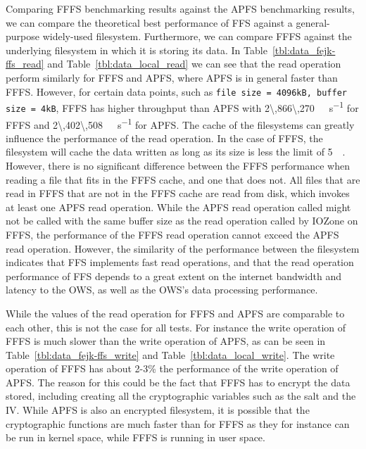 Comparing \gls{FFFS} benchmarking results against the \gls{APFS} benchmarking results, we can compare the theoretical best performance of \gls{FFS} against a \mbox{general-purpose} \mbox{widely-used} filesystem. Furthermore, we can compare \gls{FFFS} against the underlying filesystem in which it is storing its data. In Table~\ref{tbl:data_fejk-ffs_read} and Table~\ref{tbl:data_local_read} we can see that the read operation perform similarly for \gls{FFFS} and \gls{APFS}, where \gls{APFS} is in general faster than \gls{FFFS}. However, for certain data points, such as \texttt{file size = 4096kB, buffer size = 4kB}, \gls{FFFS} has higher throughput than \gls{APFS} with \SI[per-mode = symbol]{2\,866\,270}{\kilo\byte\per\second} for \gls{FFFS} and \SI[per-mode = symbol]{2\,402\,508}{\kilo\byte\per\second} for \gls{APFS}. The cache of the filesystems can greatly influence the performance of the read operation. In the case of \gls{FFFS}, the filesystem will cache the data written as long as its size is less the limit of \SI{5}{\mega\byte}. However, there is no significant difference between the \gls{FFFS} performance when reading a file that fits in the \gls{FFFS} cache, and one that does not. All files that are read in \gls{FFFS} that are not in the \gls{FFFS} cache are read from disk, which invokes at least one \gls{APFS} read operation. While the \gls{APFS} read operation called might not be called with the same buffer size as the read operation called by IOZone on \gls{FFFS}, the performance of the \gls{FFFS} read operation cannot exceed the \gls{APFS} read operation. However, the similarity of the performance between the filesystem indicates that \gls{FFS} implements fast read operations, and that the read operation performance of \gls{FFS} depends to a great extent on the internet bandwidth and latency to the \gls{OWS}, as well as the \gls{OWS}'s data processing performance.

While the values of the read operation for \gls{FFFS} and \gls{APFS} are comparable to each other, this is not the case for all tests. For instance the write operation of \gls{FFFS} is much slower than the write operation of \gls{APFS}, as can be seen in Table~\ref{tbl:data_fejk-ffs_write} and Table~\ref{tbl:data_local_write}. The write operation of \gls{FFFS} has about \mbox{2-3}\% the performance of the write operation of \gls{APFS}. The reason for this could be the fact that \gls{FFFS} has to encrypt the data stored, including creating all the cryptographic variables such as the salt and the \gls{IV}. While \gls{APFS} is also an encrypted filesystem, it is possible that the cryptographic functions are much faster than for \gls{FFFS} as they for instance can be run in kernel space, while \gls{FFFS} is running in user space.

